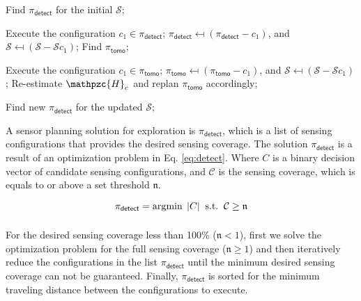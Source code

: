 \begin{algorithm}
	\caption{}
	\label{alg:1se}
	\begin{algorithmic}[1]
		\STATE Find $\pi_{\mathsf{detect}}$ for the initial $\mathcal{S}$; 
		
		\STATE Execute the configuration $c_1 \in \pi_{\mathsf{detect}}$;
		\STATE $\pi_{\mathsf{detect}} \mapsfrom (\pi_{\mathsf{detect}} - c_1) $, and $\mathcal{S} \mapsfrom (\mathcal{S} - \mathcal{S}{c_1} ) $;
		\STATE Find $\pi_{\mathsf{tomo}}$; %
		
		\STATE Execute the configuration $c_1 \in \pi_{\mathsf{tomo}}$;
		\STATE $\pi_{\mathsf{tomo}} \mapsfrom (\pi_{\mathsf{tomo}} - c_1) $, and $\mathcal{S} \mapsfrom (\mathcal{S} - \mathcal{S}{c_1} ) $;
		\STATE Re-estimate $\mathpzc{H}_c$ and replan $\pi_{\mathsf{tomo}}$ accordingly;
		\ENDWHILE
		
		\STATE Find new $\pi_{\mathsf{detect}}$ for the updated $\mathcal{S}$;%
		\ENDIF		
		\ENDWHILE		
	\end{algorithmic}
	\vskip 2pt
\end{algorithm}




A sensor planning solution for exploration is $\pi_{\mathsf{detect}}$, which is a list of sensing configurations that provides the desired sensing coverage. The solution $\pi_{\mathsf{detect}}$ is a result of an optimization problem in Eq. \ref{eq:detect}. Where $C$ is a binary decision vector of candidate sensing configurations, and $\mathcal{C}$ is the sensing coverage, which is equals to or above a set threshold $\mathfrak{n}$.

\begin{equation}
\pi_\mathsf{detect} = \displaystyle\operatorname*{\arg\!\min}_{} \; |C| \;\; \mbox{s.t.} \;\; \mathcal{C} \ge \mathfrak{n}
\label{eq:detect}
\end{equation}

For the desired sensing coverage less than 100\% ($\mathfrak{n} < 1$), first we solve the optimization problem for the full sensing coverage ($\mathfrak{n} \geq 1$) and then iteratively reduce the configurations in the list $\pi_\mathsf{detect}$ until the minimum desired sensing coverage can not be guaranteed. Finally, $\pi_\mathsf{detect}$ is sorted for the minimum traveling distance between the configurations to execute. %

